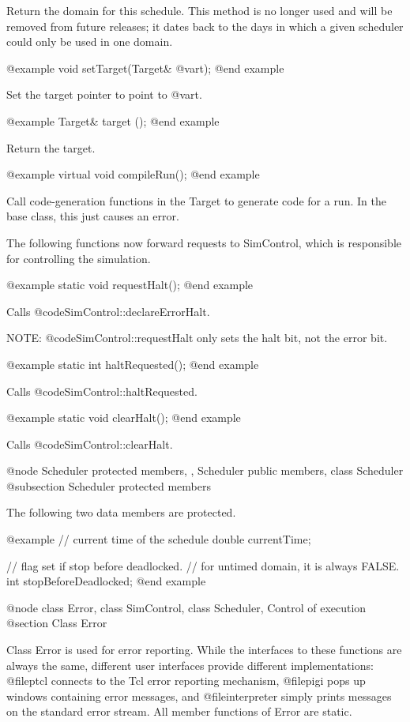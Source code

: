 Return the domain for this schedule.  This method is no longer used and
will be removed from future releases; it dates back to the days
in which a given scheduler could only be used in one domain.

@example
void setTarget(Target& @var{t});
@end example

Set the target pointer to point to @var{t}.

@example
Target& target ();
@end example

Return the target.

@example
virtual void compileRun();
@end example

Call code-generation functions in the Target to generate
code for a run.
In the base class, this just causes an error.

The following functions now forward requests to SimControl,
which is responsible for controlling the simulation.

@example
static void requestHalt();
@end example

Calls @code{SimControl::declareErrorHalt}.

NOTE: @code{SimControl::requestHalt} only sets the halt bit,
not the error bit.

@example
static int haltRequested();
@end example

Calls @code{SimControl::haltRequested}.

@example
static void clearHalt();
@end example

Calls @code{SimControl::clearHalt}.

@node Scheduler protected members,  , Scheduler public members, class Scheduler
@subsection Scheduler protected members

The following two data members are protected.

@example
// current time of the schedule
double currentTime;

// flag set if stop before deadlocked.
// for untimed domain, it is always FALSE.
int stopBeforeDeadlocked;
@end example

@node class Error, class SimControl, class Scheduler, Control of execution
@section Class Error

Class Error is used for error reporting.  While the interfaces to
these functions are always the same, different user interfaces provide
different implementations: @file{ptcl} connects to the Tcl error
reporting mechanism, @file{pigi} pops up windows containing error
messages, and @file{interpreter} simply prints messages on the standard
error stream.  All member functions of Error are static.

